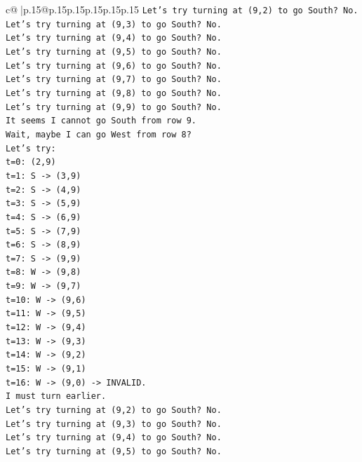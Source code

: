 \documentclass{article}
\begin{document}
{\begin{supertabular}{c@{$\;$}|p{.15\linewidth}@{}p{.15\linewidth}p{.15\linewidth}p{.15\linewidth}p{.15\linewidth}p{.15\linewidth}}
{{{\texttt{Let's try turning at (9,2) to go South? No.} \\
\texttt{Let's try turning at (9,3) to go South? No.} \\
\texttt{Let's try turning at (9,4) to go South? No.} \\
\texttt{Let's try turning at (9,5) to go South? No.} \\
\texttt{Let's try turning at (9,6) to go South? No.} \\
\texttt{Let's try turning at (9,7) to go South? No.} \\
\texttt{Let's try turning at (9,8) to go South? No.} \\
\texttt{Let's try turning at (9,9) to go South? No.} \\
\texttt{It seems I cannot go South from row 9.} \\
\texttt{Wait, maybe I can go West from row 8?} \\
\texttt{Let's try:} \\
\texttt{t=0: (2,9)} \\
\texttt{t=1: S {-}> (3,9)} \\
\texttt{t=2: S {-}> (4,9)} \\
\texttt{t=3: S {-}> (5,9)} \\
\texttt{t=4: S {-}> (6,9)} \\
\texttt{t=5: S {-}> (7,9)} \\
\texttt{t=6: S {-}> (8,9)} \\
\texttt{t=7: S {-}> (9,9)} \\
\texttt{t=8: W {-}> (9,8)} \\
\texttt{t=9: W {-}> (9,7)} \\
\texttt{t=10: W {-}> (9,6)} \\
\texttt{t=11: W {-}> (9,5)} \\
\texttt{t=12: W {-}> (9,4)} \\
\texttt{t=13: W {-}> (9,3)} \\
\texttt{t=14: W {-}> (9,2)} \\
\texttt{t=15: W {-}> (9,1)} \\
\texttt{t=16: W {-}> (9,0) {-}> INVALID.} \\
\texttt{I must turn earlier.} \\
\texttt{Let's try turning at (9,2) to go South? No.} \\
\texttt{Let's try turning at (9,3) to go South? No.} \\
\texttt{Let's try turning at (9,4) to go South? No.} \\
\texttt{Let's try turning at (9,5) to go South? No.} \\
}}}
\end{supertabular}}
\end{document}
